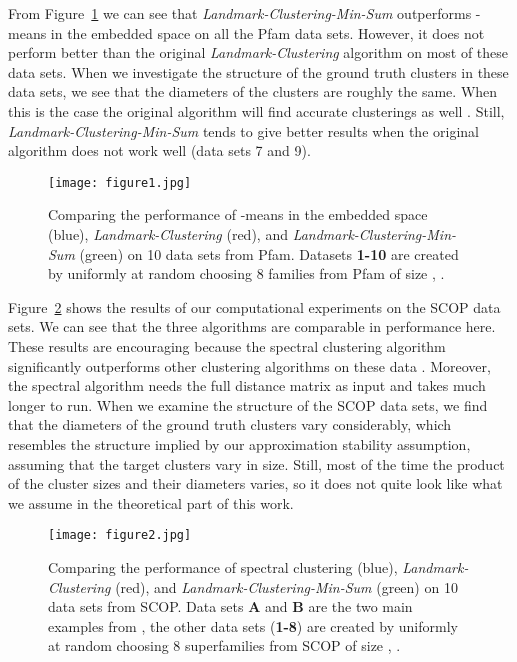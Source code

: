 \documentclass{llncs} \usepackage{algorithm}
\begin{document}
From Figure~\ref{fig:figure1} we can see that \emph{Landmark-Clustering-Min-Sum} outperforms -means in the embedded space on all the Pfam data sets.  However, it does not perform better than the original \emph{Landmark-Clustering} algorithm on most of these data sets.  When we investigate the structure of the ground truth clusters in these data sets, we see that the diameters of the clusters are roughly the same.  When this is the case the original algorithm will find accurate clusterings as well \cite{vbrtx}.  Still, \emph{Landmark-Clustering-Min-Sum} tends to give better results when the original algorithm does not work well (data sets 7 and 9).

\begin{figure}
\begin{center}
\texttt{[image: figure1.jpg]}
\caption{Comparing the performance of -means in the embedded space (blue), \emph{Landmark-Clustering} (red), and \emph{Landmark-Clustering-Min-Sum} (green) on 10 data sets from Pfam.  Datasets \textbf{1-10} are created by uniformly at random choosing 8 families from Pfam of size , . \label{fig:figure1}}
\end{center}
\end{figure}

Figure~\ref{fig:figure2} shows the results of our computational experiments on the SCOP data sets.  We can see that the three algorithms are comparable in performance here.  These results are encouraging because the spectral clustering algorithm significantly outperforms other clustering algorithms on these data \cite{spectralClusteringProteinSeqs}. Moreover, the spectral algorithm needs the full distance matrix as input and takes much longer to run.  When we examine the structure of the SCOP data sets, we find that the diameters of the ground truth clusters vary considerably, which resembles the structure implied by our approximation stability assumption, assuming that the target clusters vary in size.  Still, most of the time the product of the cluster sizes and their diameters varies, so it does not quite look like what we assume in the theoretical part of this work.

\begin{figure}
\begin{center}
\texttt{[image: figure2.jpg]}
\caption{Comparing the performance of spectral clustering (blue), \emph{Landmark-Clustering} (red), and \emph{Landmark-Clustering-Min-Sum} (green) on 10 data sets from SCOP.  Data sets \textbf{A} and \textbf{B} are the two main examples from \cite{spectralClusteringProteinSeqs}, the other data sets (\textbf{1-8}) are created by uniformly at random choosing 8 superfamilies from SCOP of size , .
\label{fig:figure2}}
\end{center}
\end{figure}
\end{document}
